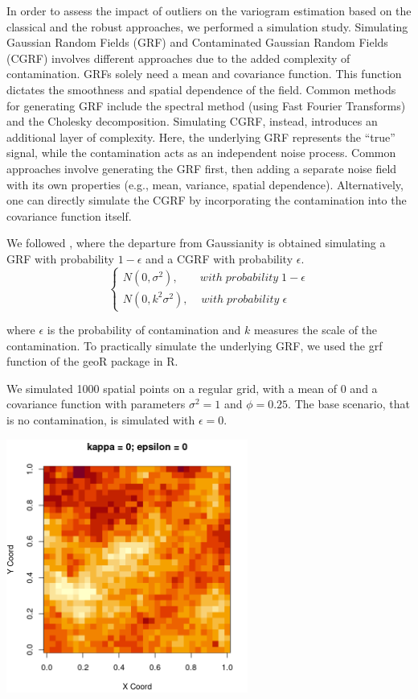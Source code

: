 \documentclass[
  12pt]{article}
\begin{document}
In order to assess the impact of outliers on the variogram estimation
based on the classical and the robust approaches, we performed a
simulation study. Simulating Gaussian Random Fields (GRF) and
Contaminated Gaussian Random Fields (CGRF) involves different approaches
due to the added complexity of contamination. GRFs solely need a mean
and covariance function. This function dictates the smoothness and
spatial dependence of the field. Common methods for generating GRF
include the spectral method (using Fast Fourier Transforms) and the
Cholesky decomposition. Simulating CGRF, instead, introduces an
additional layer of complexity. Here, the underlying GRF represents the
``true'' signal, while the contamination acts as an independent noise
process. Common approaches involve generating the GRF first, then adding
a separate noise field with its own properties (e.g., mean, variance,
spatial dependence). Alternatively, one can directly simulate the CGRF
by incorporating the contamination into the covariance function itself.

We followed \citet{cre:1980}, where the departure from Gaussianity is
obtained simulating a GRF with probability \(1 - \epsilon\) and a CGRF
with probability \(\epsilon\).\\
\[
\begin{cases}
  N(0, \sigma^2), \;\;\;\;\;\;\; with \; probability \; 1-\epsilon \\
  N(0, k^2 \sigma^2), \;\;\;\; with \; probability \; \epsilon
\end{cases}
\]

where \(\epsilon\) is the probability of contamination and \(k\)
measures the scale of the contamination. To practically simulate the
underlying GRF, we used the grf function of the geoR package in R.

We simulated 1000 spatial points on a regular grid, with a mean of 0 and
a covariance function with parameters \(\sigma^2 = 1\) and
\(\phi = 0.25\). The base scenario, that is no contamination, is
simulated with \(\epsilon = 0\).

\begin{center}
\includegraphics[width=3.125in,height=\textheight]{img/grf.png}
\end{center}
\end{document}
